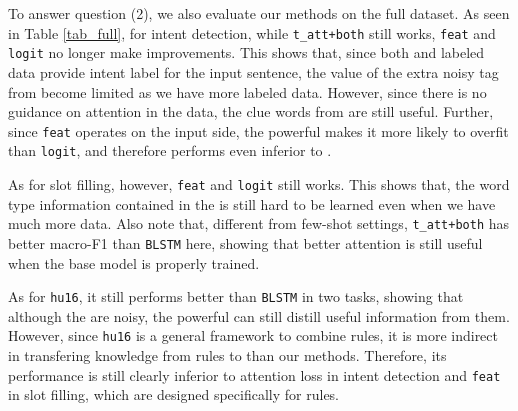 To answer question (2), we also evaluate our methods on the full dataset.
As seen in Table \ref{tab_full}, for intent detection, while \texttt{t\_att+both} still works, \texttt{feat} and \texttt{logit} no longer make improvements.
This shows that, since both \REtag and labeled data provide intent label for the input sentence, the value of the extra noisy tag from \RE become limited as we have more labeled data.
However, since there is no guidance on attention in the data, the clue words from \RE are still useful.
Further, since \texttt{feat} operates on the input side, the powerful \NN makes it more likely to overfit than \texttt{logit}, and therefore performs even inferior to \BLSTM.

As for slot filling, however, \texttt{feat} and \texttt{logit} still works.
This shows that, the word type information contained in the \REtag is still hard to be learned even when we have much more data.
Also note that, different from few-shot settings, \texttt{t\_att+both} has better macro-F1 than \texttt{BLSTM} here, showing that better attention is still useful when the base model is properly trained.

As for \texttt{hu16}, it still performs better than \texttt{BLSTM} in two tasks, showing that although the \REtags are noisy, the powerful \NN can still distill useful information from them.
However, since \texttt{hu16} is a general framework to combine \FOL rules, it is more indirect in transfering knowledge from rules to \NN than our methods. Therefore, its performance is still clearly inferior to attention loss in intent detection and \texttt{feat} in slot filling, which are designed specifically for \RE rules.

